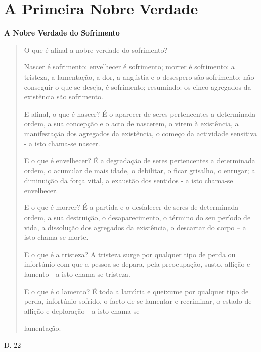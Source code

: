 \chapter{A Primeira Nobre Verdade}

\textbf{A Nobre Verdade do Sofrimento}

\begin{quote}
O que é afinal a nobre verdade do sofrimento?

Nascer é sofrimento; envelhecer é sofrimento; morrer é sofrimento; a tristeza, a lamentação, a dor, a angústia e o desespero são sofrimento; não conseguir o que se deseja, é sofrimento; resumindo: os cinco agregados da existência são sofrimento.

E afinal, o que é nascer? É o aparecer de seres pertencentes a determinada ordem, a sua concepção e o acto de nascerem, o virem à existência, a manifestação dos agregados da existência, o começo da actividade sensitiva - a isto chama-se nascer.

E o que é envelhecer? É a degradação de seres pertencentes a determinada ordem, o acumular de mais idade, o debilitar, o ficar grisalho, o enrugar; a diminuição da força vital, a exaustão dos sentidos - a isto chama-se envelhecer.

E o que é morrer? É a partida e o desfalecer de seres de determinada ordem, a sua destruição, o desaparecimento, o término do seu período de vida, a dissolução dos agregados da existência, o descartar do corpo -- a isto chama-se morte.

E o que é a tristeza? A tristeza surge por qualquer tipo de perda ou infortúnio com que a pessoa se depara, pela preocupação, susto, aflição e lamento - a isto chama-se tristeza.

E o que é o lamento? É toda a lamúria e queixume por qualquer tipo de perda, infortúnio sofrido, o facto de se lamentar e recriminar, o estado de aflição e deploração - a isto chama-se

lamentação.
\end{quote}

D. 22

